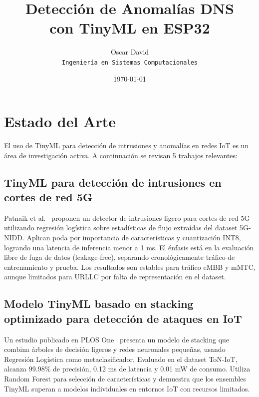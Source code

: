 \documentclass[12pt,a4paper]{article}
\title{\Huge \textbf{Detección de Anomalías DNS\\ con TinyML en ESP32}}
\author{
    Oscar David \\
    \texttt{Ingeniería en Sistemas Computacionales}
    \vspace{1cm}
}
\date{\today}
\begin{document}
\maketitle
\thispagestyle{empty}
\newpage

\tableofcontents
\newpage

\section{Estado del Arte}
\label{sec:estado}

El uso de TinyML para detección de intrusiones y anomalías en redes IoT es un área de investigación activa. A continuación se revisan 5 trabajos relevantes:

\subsection{TinyML para detección de intrusiones en cortes de red 5G}
\label{sec:paper5}

Patnaik et al.~\cite{patnaik2026tinyml} proponen un detector de intrusiones ligero para cortes de red 5G utilizando regresión logística sobre estadísticas de flujo extraídas del dataset 5G-NIDD. Aplican poda por importancia de características y cuantización INT8, logrando una latencia de inferencia menor a 1 ms. El énfasis está en la evaluación libre de fuga de datos (leakage-free), separando cronológicamente tráfico de entrenamiento y prueba. Los resultados son estables para tráfico eMBB y mMTC, aunque limitados para URLLC por falta de representación en el dataset.

\subsection{Modelo TinyML basado en stacking optimizado para detección de ataques en IoT}
\label{sec:paper1}

Un estudio publicado en PLOS One~\cite{stacking2025tinyml} presenta un modelo de stacking que combina árboles de decisión ligeros y redes neuronales pequeñas, usando Regresión Logística como metaclasificador. Evaluado en el dataset ToN-IoT, alcanza 99.98\% de precisión, 0.12 ms de latencia y 0.01 mW de consumo. Utiliza Random Forest para selección de características y demuestra que los ensembles TinyML superan a modelos individuales en entornos IoT con recursos limitados.
\end{document}

